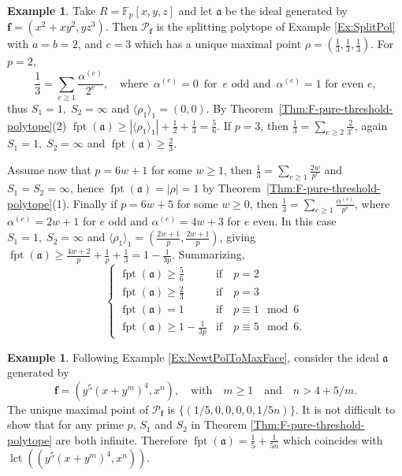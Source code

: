 \documentclass[12pt]{amsart}
\theoremstyle{definition}
\newtheorem{example}[theorem]{Example}
\numberwithin{equation}{subsection}
\DeclareMathOperator{\fpt}{fpt}
\newcommand{\lct}{{\operatorname{lct}}}
\newcommand{\FF}{\mathbb{F}}
\newcommand{\fa}{\mathfrak{a}}
\newcommand{\SP}{\mathcal{P}}
\newcommand{\Bf}{\boldsymbol{f}}
\renewcommand{\!}[1]{{\color{red}\text{\Huge$\star$ }#1}}
\begin{document}
\begin{example}\label{Example fptIdeal}
Take $R=\FF_p[x,y,z]$ and let $\fa$ be the ideal generated by $\Bf=(x^2+xy^2,yz^3)$. Then $\SP_{\Bf}$ is the splitting polytope of Example \ref{Ex:SplitPol} with $a=b=2$, and $c=3$ which has a unique maximal point $\rho=\left(\frac{1}{3} ,\frac{1}{3}, \frac{1}{3} \right)$. 
For $p=2$, 
\[
\frac{1}{3}=\sum_{e\geq 1} \frac{\alpha^{(e)}}{2^{e}},\quad \text{where }\, \alpha^{(e)}=0 \, \text{ for }\,  e \text{ odd and }\,  \alpha^{(e)}=1 \text{ for even } e,
\]
thus $S_1=1,\; S_2=\infty$ and $\langle \rho_1 \rangle_1=(0,0)$. By Theorem~\ref{Thm:F-pure-threshold-polytope}(2)  $\fpt(\fa)\geq |\langle \rho_1 \rangle_1|+\frac{1}{2}+\frac{1}{3}=\frac{5}{6}$. 
If $p=3$, then $\frac{1}{3}=\sum_{e\geq 2} \frac{2}{3^{e}}$, again $S_1=1,\; S_2=\infty$ and $\fpt(\fa)\geq \frac{2}{3}$.

Assume now that $p=6w+1$ for some $w\geq 1$, then $\frac{1}{3}=\sum_{e\geq 1} \frac{2w}{p^{e}}$ and $S_1=S_2=\infty$, hence $\fpt(\fa)= | \rho|=1$ by Theorem~\ref{Thm:F-pure-threshold-polytope}(1). Finally if $p=6w+5$ for some $w\geq 0$, then $\frac{1}{3}=\sum_{e\geq 1} \frac{\alpha^{(e)}}{p^{e}}$, where $\alpha^{(e)}=2w+1$ for $e$ odd and  $\alpha^{(e)}=4w+3$ for $e$ even. In this case $S_1=1,\;S_2=\infty$ and $\langle \rho_1 \rangle_1=\left(\frac{2w+1}{p},\frac{2w+1}{p}\right)$, giving $\fpt(\fa)\geq \frac{4w+2}{p}+\frac{1}{p}+\frac{1}{3}=1-\frac{1}{3p}$. Summarizing,
$$
	\begin{cases}
		 \fpt(\fa) \geq \frac{5}{6}& \text{if}\quad p=2\\
		\fpt(\fa) \geq \frac{2}{3}& \text{if}\quad p=3\\
		\fpt(\fa)=1& \text{if}\quad p\equiv 1 \mod 6 \\
		\fpt(\fa)\geq 1-\frac{1}{3p}& \text{if}\quad p\equiv 5 \mod 6.
	\end{cases}
	$$ 
\end{example}
\begin{example}\label{Ex:fptequallct}
	Following Example \ref{Ex:NewtPolToMaxFace}, consider the ideal $\fa$ generated by
	\[\Bf=(y^{5}(x+y^m)^4,x^n),\quad \text{with}\quad m\geq 1\quad \text{and}\quad n > 4+5/m.
	\]
	The unique maximal point of $\SP_{\Bf}$ is $\{(1/5,0,0,0,0,1/5n)\}$. It is not difficult to show that for any prime $p$, $S_1$ and $S_2$ in Theorem \ref{Thm:F-pure-threshold-polytope} are both infinite. Therefore $\fpt(\fa)=\frac{1}{5}+\frac{1}{5n}$ which coincides with  $\lct((y^{5}(x+y^m)^4,x^n))$.
\end{example}
\end{document}
